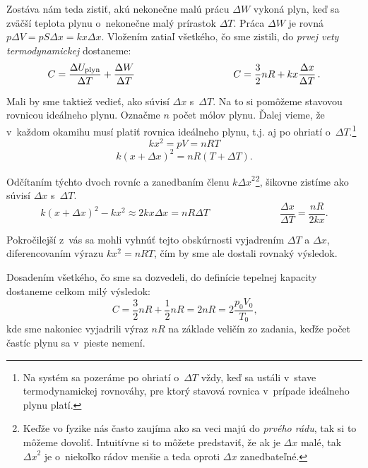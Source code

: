 Zostáva nám teda zistiť, akú nekonečne malú prácu $\Delta W$ vykoná plyn, keď sa zväčší teplota plynu o~nekonečne malý 
prírastok $\Delta T$. Práca $\Delta W$ je rovná $p\Delta V = pS\Delta x = kx\Delta x$. Vložením zatiaľ všetkého, čo sme zistili, do 
\emph{prvej vety termodynamickej} dostaneme:
$$C = \frac{\Delta U_{\text{plyn}}}{\Delta T} + \frac{\Delta W}{\Delta T} \hspace{3.5cm}
C = \frac{3}{2}nR + kx\frac{\Delta x}{\Delta T} \,\text{.}$$

Mali by sme taktiež vedieť, ako súvisí $\Delta x$ s~$\Delta T$. Na to si pomôžeme stavovou rovnicou ideálneho plynu. Označme $n$ počet 
mólov plynu. Ďalej vieme, že v~každom okamihu musí platiť rovnica ideálneho plynu, t.j. aj po ohriatí o~$\Delta T$.\footnote{Na 
systém sa pozeráme po ohriatí o~$\Delta T$ vždy, keď sa ustáli v~stave termodynamickej rovnováhy, pre ktorý stavová rovnica
v~prípade ideálneho plynu platí.}
$$kx^2  = pV = nRT $$
$$k{\left(x+\Delta x\right)}^2 = nR\left(T+\Delta T\right)\text{.}$$

Odčítaním týchto dvoch rovníc a zanedbaním členu $k{\Delta x}^2$\footnote{Keďže vo fyzike nás často zaujíma ako sa veci majú 
do \emph{prvého rádu}, tak si to môžeme dovoliť. Intuitívne si to môžete predstaviť, že ak je $\Delta x$ malé, tak ${\Delta x}^2$ 
je o~niekoľko rádov menšie
 a teda oproti $\Delta x$ zanedbateľné.}, šikovne zistíme ako súvisí $\Delta x$ s~$\Delta T$.
$$k{\left(x+\Delta x\right)}^2 - kx^2 \approx 2kx\Delta x = nR\Delta T \hspace{3cm}
\frac{\Delta x}{\Delta T} = \frac{nR}{2kx}\text{.}$$

Pokročilejší z~vás sa mohli vyhnúť tejto obskúrnosti vyjadrením $\Delta T$ a $\Delta x$, diferencovaním výrazu $kx^2 = nRT$,
čím by sme ale dostali rovnaký výsledok.

Dosadením všetkého, čo sme sa dozvedeli, do definície tepelnej kapacity dostaneme celkom milý výsledok:
$$C = \frac{3}{2}nR + \frac{1}{2}nR = 2nR = 2\frac{p_0 V_0}{T_0} \text{,}$$
kde sme nakoniec vyjadrili výraz $nR$ na základe veličín zo zadania, keďže počet častíc plynu sa v~pieste nemení.
